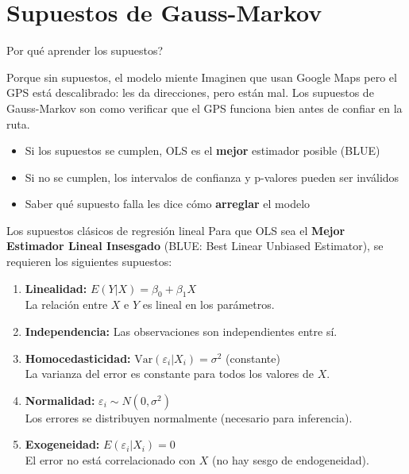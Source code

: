 \documentclass[aspectratio=169, 11pt]{beamer}
\begin{document}
\section{Supuestos de Gauss-Markov}

\begin{frame}{\textquestiondown{}Por qu\'e aprender los supuestos?}
\begin{exampleblock}{Porque sin supuestos, el modelo miente}
\small
Imaginen que usan Google Maps pero el GPS est\'a descalibrado: les da direcciones, pero est\'an mal. Los supuestos de Gauss-Markov son como verificar que el GPS funciona bien antes de confiar en la ruta.
\begin{itemize}\setlength{\itemsep}{1pt}
  \item Si los supuestos se cumplen, OLS es el \textbf{mejor} estimador posible (BLUE)
  \item Si no se cumplen, los intervalos de confianza y p-valores pueden ser inv\'alidos
  \item Saber qu\'e supuesto falla les dice c\'omo \textbf{arreglar} el modelo
\end{itemize}
\end{exampleblock}
\end{frame}

\begin{frame}{Los supuestos clásicos de regresión lineal}
Para que OLS sea el \textbf{Mejor Estimador Lineal Insesgado} (BLUE: Best Linear Unbiased Estimator), se requieren los siguientes supuestos:

\vspace{0.2cm}
\begin{enumerate}
  \item \textbf{Linealidad:} $E(Y|X) = \beta_0 + \beta_1 X$\\
    La relación entre $X$ e $Y$ es lineal en los parámetros.

  \item \textbf{Independencia:} Las observaciones son independientes entre sí.

  \item \textbf{Homocedasticidad:} $\text{Var}(\varepsilon_i | X_i) = \sigma^2$ (constante)\\
    La varianza del error es constante para todos los valores de $X$.

  \item \textbf{Normalidad:} $\varepsilon_i \sim N(0, \sigma^2)$\\
    Los errores se distribuyen normalmente (necesario para inferencia).

  \item \textbf{Exogeneidad:} $E(\varepsilon_i | X_i) = 0$\\
    El error no está correlacionado con $X$ (no hay sesgo de endogeneidad).
\end{enumerate}
\end{frame}
\end{document}
